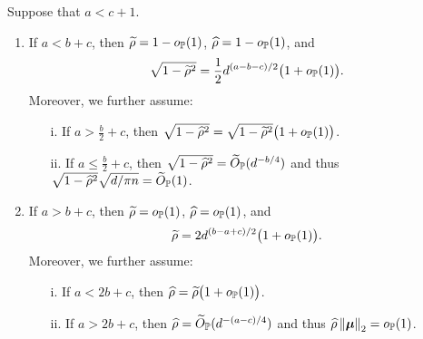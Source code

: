 \begin{lem} \label{lem:rho_hat}
    Suppose that $a < c + 1$.
    \begin{enumerate}[label=(\alph*)]
        \item \label{lem:rho_hat(a)} If $a < b + c$, then $\wt\rho = 1 - o_\P(1)$, $\hat\rho = 1 - o_\P(1)$, and
        \begin{equation*}
            \sqrt{1 - \wt\rho^2} = \frac12 d^{(a-b-c)/2}\bigl( 1 + o_\P(1) \bigr).
        \end{equation*}
        Moreover, we further assume:
        \begin{itemize}
            \item[i.] If $a > \frac{b}{2} + c$, then $\sqrt{1 - \hat\rho^2} = \sqrt{1 - \wt\rho^2} \bigl(1 + o_\P(1)\bigr)$.
            \item[ii.] If $a \le \frac{b}{2} + c$, then $\sqrt{1 - \hat\rho^2} = \wt O_\P(d^{-b/4})$ and thus $\sqrt{1 - \hat\rho^2}\sqrt{d/\pi n} = \wt O_\P(1)$.
        \end{itemize}
        \item \label{lem:rho_hat(b)} If $a > b + c$, then $\wt\rho = o_\P(1)$, $\hat\rho = o_\P(1)$, and
        \begin{equation*}
            \wt\rho = 2d^{(b-a+c)/2}\bigl(1 + o_\P(1)\bigr).
        \end{equation*}
        Moreover, we further assume:
        \begin{itemize}
            \item[i.] If $a < 2b + c$, then $\hat\rho = \wt\rho \bigl(1 + o_\P(1)\bigr)$.
            \item[ii.] If $a > 2b + c$, then $\hat \rho = \wt O_\P(d^{-(a-c)/4})$ and thus $\hat \rho \norm{\vmu}_2 = o_\P(1)$.
        \end{itemize}
    \end{enumerate}
\end{lem}
